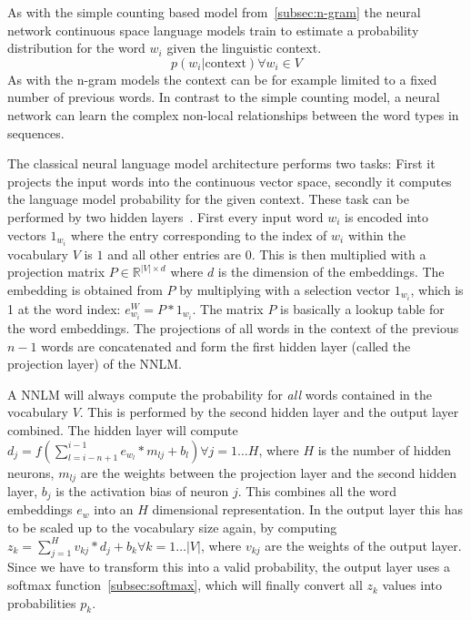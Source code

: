 As with the simple counting based model from~\ref{subsec:n-gram} the neural network continuous space language models train to
estimate a probability distribution for the word $w_i$ given the linguistic context.
\[
    p(w_i|\text{context}) \forall w_i \in V
\]
As with the n-gram models the context can be for example limited to a fixed number of previous words. In contrast to the
simple counting model, a neural network can learn the complex non-local relationships between the word types in sequences.

The classical neural language model architecture performs two tasks: First it projects the input words into the continuous vector space,
secondly it computes the language model probability for the given context. These task can be performed by two 
hidden layers~\cite{Schwenk:2007:CSL:1230156.1230409}. 
First every input word $w_i$ is encoded into vectors $1_{w_i}$ where
the entry corresponding to the index of $w_i$ within the vocabulary $V$ is $1$ and all other entries are $0$. 
This is then multiplied with a projection matrix $P \in \mathbb{R}^{|V| \times d}$ where $d$ is the dimension of the embeddings.
The embedding is obtained from $P$ by multiplying with a selection vector $1_{w_i}$, 
which is 1 at the word index: $e_{w_i}^W = P * 1_{w_i}$. The matrix $P$ is basically a lookup 
table for the word embeddings. 
The projections of all words in the context of the previous $n-1$ words are concatenated and form 
the first hidden layer (called the projection layer) of the NNLM.

A NNLM will always compute the probability for \textit{all} words contained in the vocabulary $V$. 
This is performed by the second hidden layer and the output layer combined. 
The hidden layer will compute $d_j = f(\sum_{l = i-n+1}^{i-1} e_{w_l} * m_{lj} + b_l) \forall j = 1 \dots H$, 
where $H$ is the number of hidden neurons, $m_{lj}$ are the weights between the projection layer and the second hidden layer,
$b_j$ is the activation bias of neuron $j$. This combines all the word embeddings $e_w$ into an $H$ dimensional representation.
In the output layer this has to be scaled up to the vocabulary size again, 
by computing $z_k = \sum_{j = 1}^{H} v_{kj} * d_j + b_k \forall k = 1 \dots |V|$, where $v_{kj}$ are the weights of the output layer.
Since we have to transform this into a valid probability, the output layer uses a softmax function~\ref{subsec:softmax}, which
will finally convert all $z_k$ values into probabilities $p_k$.
 
